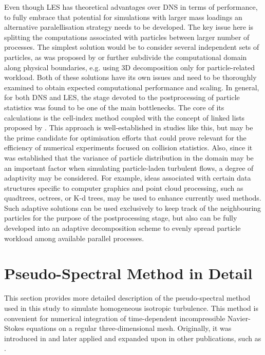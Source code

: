 \documentclass{pracamgren}
\begin{document}
Even though LES has theoretical advantages over DNS in terms of performance, to fully embrace that potential for simulations with larger mass loadings an alternative paralellisation strategy needs to be developed.
The key issue here is splitting the computations associated with particles between larger number of processes.
The simplest solution would be to consider several independent sets of particles, as was proposed by \textcite{Ayala2014} or further subdivide the computational domain along physical boundaries, e.g. using 3D decomposition only for particle-related workload.
Both of these solutions have its own issues and need to be thoroughly examined to obtain expected computational performance and scaling.
In general, for both DNS and LES, the stage devoted to the postprocessing of particle statistics was found to be one of the main bottlenecks.
The core of its calculations is the cell-index method coupled with the concept of linked lists proposed by \textcite{Allen1987}.
This approach is well-established in studies like this, but may be the prime candidate for optimisation efforts that could prove relevant for the efficiency of numerical experiments focused on collision statistics.
Also, since it was established that the variance of particle distribution in the domain may be an important factor when simulating particle-laden turbulent flows, a degree of adaptivity may be considered.
For example, ideas associated with certain data structures specific to computer graphics and point cloud processing, such as quadtrees, octrees, or K-d trees, may be used to enhance currently used methods.
Such adaptive solutions can be used exclusively to keep track of the neighbouring particles for the purpose of the postprocessing stage, but also can be fully developed into an adaptive decomposition scheme to evenly spread particle workload among available parallel processes.



\appendix
\chapter{Pseudo-Spectral Method in Detail}
\label{app:psm}

This section provides more detailed description of the pseudo-spectral method used in this study to simulate homogeneous isotropic turbulence. 
This method is convenient for numerical integration of time-dependent incompressible Navier-Stokes equations on a regular three-dimensional mesh.
Originally, it was introduced in \textcite{Orszag1972} and later applied and expanded upon in other publications, such as \textcite{Rogallo1981,Eswaran1988,Pope2000,Peng2009}.
\end{document}
